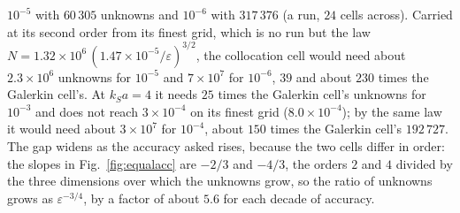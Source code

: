 \documentclass[11pt,a4paper]{article}
\begin{document}
$10^{-5}$ with $60\,305$ unknowns and $10^{-6}$ with $317\,376$ (a run, $24$ cells across). Carried at its
second order from its finest grid, which is no run but the law
$N=1.32\times10^6\,(1.47\times10^{-5}/\varepsilon)^{3/2}$, the collocation cell would need about
$2.3\times10^6$ unknowns for $10^{-5}$ and $7\times10^7$ for $10^{-6}$, $39$ and about $230$ times the
Galerkin cell's. At $k_Sa=4$ it needs $25$ times the Galerkin cell's unknowns for $10^{-3}$ and does not
reach $3\times10^{-4}$ on its finest grid ($8.0\times10^{-4}$); by the same law it would need about
$3\times10^7$ for $10^{-4}$, about $150$ times the Galerkin cell's $192\,727$. The gap widens as the accuracy
asked rises, because the two cells differ in order: the slopes in Fig.~\ref{fig:equalacc} are $-2/3$ and
$-4/3$, the orders $2$ and $4$ divided by the three dimensions over which the unknowns grow, so the ratio
of unknowns grows as $\varepsilon^{-3/4}$, by a factor of about $5.6$ for each decade of accuracy.
\end{document}
